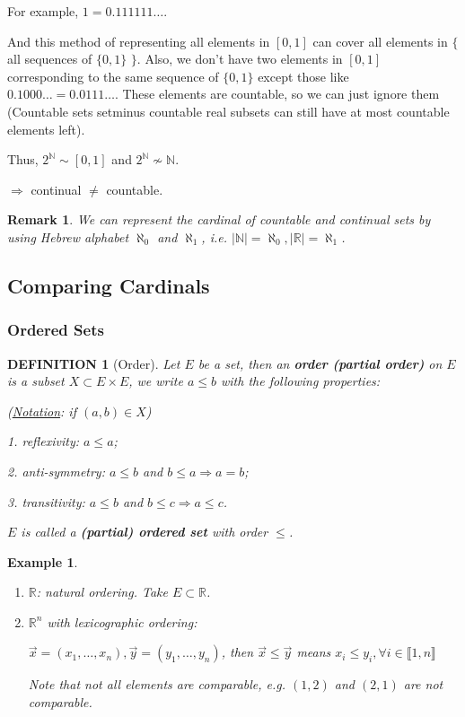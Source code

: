 \documentclass[12pt]{article}
\theoremstyle{blueplain}
\theoremstyle{bluedef}
\newtheorem{definition}{DEFINITION}[section]
\theoremstyle{blueremark}
\newtheorem{remark}{Remark}[section]
\newtheorem{example}{Example}[section]
\newcommand{\R}{\mathbb{R}}
\newcommand{\N}{\mathbb{N}}
\numberwithin{equation}{section}
\begin{document}
      For example, $1 = 0.111111\dots$.

      And this method of representing all elements in $[0,1]$ can cover all elements in $\{$ all sequences of $\{0,1\}$ $\}$. Also, we don't have two elements in $[0,1]$ corresponding to the same sequence of $\{0,1\}$ except those like $0.1000\dots = 0.0111\dots$. These elements are countable, so we can just ignore them (Countable sets setminus countable real subsets can still have at most countable elements left).

      Thus, $2^\N \sim [0,1]$ and $2^\N \not\sim \N$.

    $\Rightarrow$ continual $\not=$ countable.

      \begin{remark}
        We can represent the cardinal of countable and continual sets by using Hebrew alphabet $\aleph_0$ and $\aleph_1$, i.e. $|\N| = \aleph_0, |\R| = \aleph_1$.
      \end{remark}

      \clearpage

      \subsection{Comparing Cardinals}

      \subsubsection{Ordered Sets}

      \begin{definition}[Order]

        Let $E$ be a set, then an \textbf{order (partial order)} on $E$ is a subset $X \subset E \times E$, we write $a \leq b$ with the following properties:

        (\underline{Notation}: if $(a,b) \in X$)

        1. reflexivity: $a \leq a$;

        2. anti-symmetry: $a \leq b$ and $b \leq a \Rightarrow a = b$;

        3. transitivity: $a \leq b$ and $b \leq c \Rightarrow a \leq c$.

        $E$ is called a \textbf{(partial) ordered set} with order $\leq$.
      \end{definition}

      \begin{example}
        \begin{enumerate}
          \item $\R$: natural ordering. Take $E \subset \R$.
          \item $\R^n$ with lexicographic ordering:

                $\vec{x} = (x_1, \ldots, x_n), \vec{y} = (y_1, \ldots, y_n)$, then $\vec{x} \leq \vec{y}$ means $x_i \leq y_i, \forall i \in \llbracket 1, n \rrbracket$

                Note that not all elements are comparable, e.g. $(1,2)$ and $(2,1)$ are not comparable.
        \end{enumerate}
      \end{example}
\end{document}
